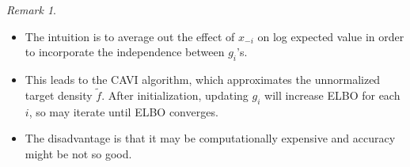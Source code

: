 \documentclass{article}
\theoremstyle{remark}
\newtheorem{remark}[example]{Remark}
\begin{document}
\begin{remark}
    \begin{itemize}
    \item The intuition is to average out the effect of $x_{-i}$ on log expected value in order to incorporate the independence between $g_i$'s. 
\item This leads to the CAVI algorithm, which approximates the unnormalized target density $\tilde{f}$. After initialization, 
updating $g_i$ will increase ELBO for each $i$, so may iterate until ELBO converges.
\item The disadvantage is that it may be computationally expensive and accuracy might be not so good. 
    \end{itemize}
\end{remark}
\end{document}
